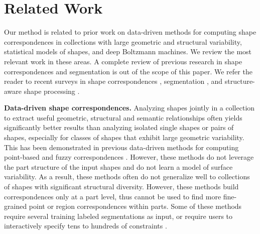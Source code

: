 \section{Related Work}
\label{sec:related_work}

Our method is related to prior work on data-driven methods for computing shape correspondences in collections with large geometric and structural variability, statistical models of shapes, and deep Boltzmann machines. We review the most relevant work in these areas. A complete review of previous research in shape correspondences and segmentation is out of the scope of this paper. We refer the reader to recent surveys in shape correspondences \cite{vanKaick11},  segmentation \cite{Theologou2015}, and structure-aware shape processing \cite{Mitra13}. 

\textbf{Data-driven shape correspondences.} Analyzing shapes jointly in a collection to extract useful geometric, structural and semantic relationships often yields significantly better results than analyzing isolated single shapes or pairs of shapes, especially for classes of shapes that exhibit large geometric variability. This has been demonstrated in previous data-driven methods for computing point-based and fuzzy correspondences \cite{Kim12,Huang12,Huang13,Huang13b}.  However, these methods do not leverage the part structure of the input shapes and do not learn a model of surface variability. As a result, these methods often do not generalize well to collections of shapes with significant structural diversity.  However, these methods build correspondences only at a part level, thus cannot be used to find more fine-grained point or region correspondences within parts. Some of these methods require several training labeled segmentations \cite{Kalogerakis10,vanKaick11,Zhige2014} as input, or require users to interactively specify tens to hundreds of constraints \cite{Wang12}. 

